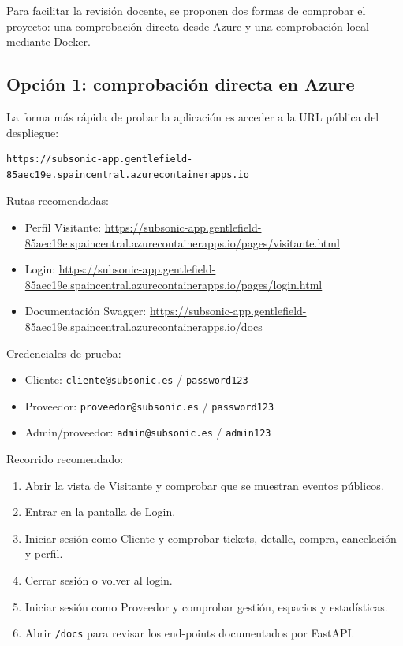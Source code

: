 \documentclass[11pt,a4paper]{article}
\begin{document}
Para facilitar la revisi\'on docente, se proponen dos formas de comprobar el proyecto: una comprobaci\'on directa desde Azure y una comprobaci\'on local mediante Docker.

\subsection{Opci\'on 1: comprobaci\'on directa en Azure}

La forma m\'as r\'apida de probar la aplicaci\'on es acceder a la URL p\'ublica del despliegue:

\begin{verbatim}
https://subsonic-app.gentlefield-85aec19e.spaincentral.azurecontainerapps.io
\end{verbatim}

Rutas recomendadas:

\begin{itemize}
  \item Perfil Visitante: \url{https://subsonic-app.gentlefield-85aec19e.spaincentral.azurecontainerapps.io/pages/visitante.html}
  \item Login: \url{https://subsonic-app.gentlefield-85aec19e.spaincentral.azurecontainerapps.io/pages/login.html}
  \item Documentaci\'on Swagger: \url{https://subsonic-app.gentlefield-85aec19e.spaincentral.azurecontainerapps.io/docs}
\end{itemize}

Credenciales de prueba:

\begin{itemize}
  \item Cliente: \texttt{cliente@subsonic.es} / \texttt{password123}
  \item Proveedor: \texttt{proveedor@subsonic.es} / \texttt{password123}
  \item Admin/proveedor: \texttt{admin@subsonic.es} / \texttt{admin123}
\end{itemize}

Recorrido recomendado:

\begin{enumerate}
  \item Abrir la vista de Visitante y comprobar que se muestran eventos p\'ublicos.
  \item Entrar en la pantalla de Login.
  \item Iniciar sesi\'on como Cliente y comprobar tickets, detalle, compra, cancelaci\'on y perfil.
  \item Cerrar sesi\'on o volver al login.
  \item Iniciar sesi\'on como Proveedor y comprobar gesti\'on, espacios y estad\'isticas.
  \item Abrir \texttt{/docs} para revisar los end-points documentados por FastAPI.
\end{enumerate}
\end{document}
